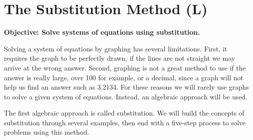 \documentclass[12pt]{book}
\theoremstyle{definition}
\begin{document}
\section{The Substitution Method (L)}
{\bf Objective: Solve systems of equations using substitution.}\par
Solving a system of equations by graphing has several limitations. First, it requires the graph to be perfectly drawn, if the lines are not straight we may arrive
at the wrong answer. Second, graphing is not a great method to use if the answer is really large, over 100 for example, or a decimal, since a graph will not help us find an answer such as 3.2134. For these reasons we
will rarely use graphs to solve a given system of equations. Instead, an algebraic approach will be used.\par
The first algebraic approach is called substitution. We will build the concepts of substitution through several examples, then end with a five-step
process to solve problems using this method.
\end{document}
